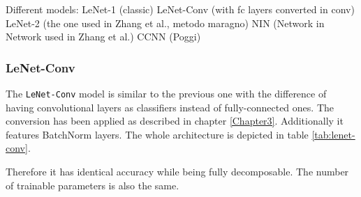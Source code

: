 Different models:  LeNet-1 (classic) LeNet-Conv (with fc layers converted in conv)  LeNet-2 (the one used in Zhang et al., metodo maragno) NIN (Network in Network used in Zhang et al.)  
CCNN (Poggi)


\subsubsection{LeNet-Conv}
The \texttt{LeNet-Conv} model is similar to the previous one with the difference of having convolutional layers as classifiers instead of fully-connected ones. The conversion has been applied as described in chapter \ref{Chapter3}. Additionally it features BatchNorm layers. The whole architecture is depicted in table \ref{tab:lenet-conv}. 

Therefore it has identical accuracy while being fully decomposable. The number of trainable parameters is also the same.  

